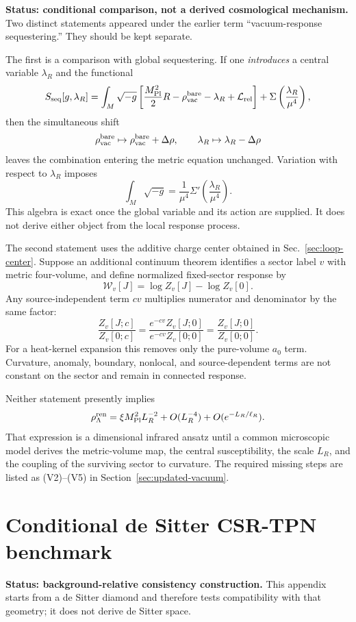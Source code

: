 \documentclass[11pt]{article}
\begin{document}
\textbf{Status: conditional comparison, not a derived cosmological
mechanism.}
Two distinct statements appeared under the earlier term
``vacuum-response sequestering.''  They should be kept separate.

The first is a comparison with global sequestering.  If one \emph{introduces}
a central variable \(\lambda_R\) and the functional
\[
S_{\rm seq}[g,\lambda_R]
=\int_M\sqrt{-g}\left[
\frac{M_{\rm Pl}^2}{2}R-\rho_{\rm vac}^{\rm bare}
-\lambda_R+\mathcal L_{\rm rel}\right]
+\Sigma\left(\frac{\lambda_R}{\mu^4}\right),
\]
then the simultaneous shift
\[
\rho_{\rm vac}^{\rm bare}\mapsto\rho_{\rm vac}^{\rm bare}+\Delta\rho,
\qquad
\lambda_R\mapsto\lambda_R-\Delta\rho
\]
leaves the combination entering the metric equation unchanged.  Variation
with respect to \(\lambda_R\) imposes
\[
\int_M\sqrt{-g}
=\frac{1}{\mu^4}\Sigma'\left(\frac{\lambda_R}{\mu^4}\right).
\]
This algebra is exact once the global variable and its action are supplied.
It does not derive either object from the local response process.

The second statement uses the additive charge center obtained in
Sec.~\ref{sec:loop-center}.  Suppose an additional continuum theorem
identifies a sector label \(v\) with metric four-volume, and define normalized
fixed-sector response by
\[
\mathcal W_v[J]=\log Z_v[J]-\log Z_v[0].
\]
Any source-independent term \(cv\) multiplies numerator and denominator by
the same factor:
\[
\frac{Z_v[J;c]}{Z_v[0;c]}
=\frac{e^{-cv}Z_v[J;0]}{e^{-cv}Z_v[0;0]}
=\frac{Z_v[J;0]}{Z_v[0;0]}.
\]
For a heat-kernel expansion this removes only the pure-volume \(a_0\) term.
Curvature, anomaly, boundary, nonlocal, and source-dependent terms are not
constant on the sector and remain in connected response.

Neither statement presently implies
\[
\rho_\Lambda^{\rm ren}
=\xi M_{\rm Pl}^2L_R^{-2}
+O(L_R^{-4})+O(e^{-L_R/\ell_R}).
\]
That expression is a dimensional infrared ansatz until a common microscopic
model derives the metric-volume map, the central susceptibility, the scale
\(L_R\), and the coupling of the surviving sector to curvature.  The
required missing steps are listed as (V2)--(V5) in
Section~\ref{sec:updated-vacuum}.

\section{Conditional de Sitter CSR-TPN benchmark}\label{app:ds}

\textbf{Status: background-relative consistency construction.}
This appendix starts from a de Sitter diamond and therefore tests
compatibility with that geometry; it does not derive de Sitter space.
\end{document}
